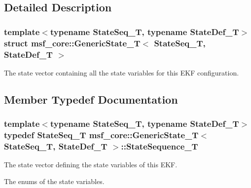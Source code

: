 \subsection{Detailed Description}
\subsubsection*{template$<$typename State\-Seq\-\_\-\-T, typename State\-Def\-\_\-\-T$>$struct msf\-\_\-core\-::\-Generic\-State\-\_\-\-T$<$ State\-Seq\-\_\-\-T, State\-Def\-\_\-\-T $>$}

The state vector containing all the state variables for this E\-K\-F configuration. 

\subsection{Member Typedef Documentation}
\hypertarget{structmsf__core_1_1GenericState__T_a75fe70f7c7517dbf7d4c91b75b08a1dd}{
\subsubsection[{State\-Sequence\-\_\-\-T}]{\setlength{\rightskip}{0pt plus 5cm}template$<$typename State\-Seq\-\_\-\-T, typename State\-Def\-\_\-\-T$>$ typedef State\-Seq\-\_\-\-T {\bf msf\-\_\-core\-::\-Generic\-State\-\_\-\-T}$<$ State\-Seq\-\_\-\-T, State\-Def\-\_\-\-T $>$\-::{\bf State\-Sequence\-\_\-\-T}}}\label{structmsf__core_1_1GenericState__T_a75fe70f7c7517dbf7d4c91b75b08a1dd}


The state vector defining the state variables of this E\-K\-F. 

The enums of the state variables. 

